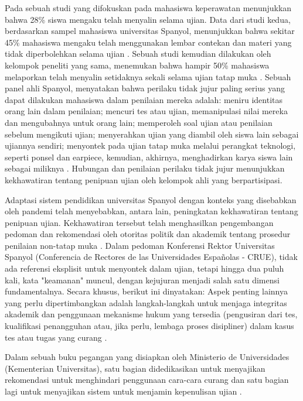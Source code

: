 Pada sebuah studi yang difokuskan pada mahasiswa keperawatan \citep{blanch2006nivel} menunjukkan bahwa 28\% siswa mengaku telah menyalin selama ujian. Data dari studi kedua, berdasarkan sampel mahasiswa universitas Spanyol, menunjukkan bahwa sekitar 45\% mahasiswa mengaku telah menggunakan lembar contekan dan materi yang tidak diperbolehkan selama ujian \citep{sureda2009practicas}. Sebuah studi kemudian dilakukan oleh kelompok peneliti yang sama, menemukan bahwa hampir 50\% mahasiswa melaporkan telah menyalin setidaknya sekali selama ujian tatap muka \citep{comas2011integridad}. Sebuah panel ahli Spanyol, menyatakan bahwa perilaku tidak jujur paling serius yang dapat dilakukan mahasiswa dalam penilaian mereka adalah: meniru identitas orang lain dalam penilaian; mencuri tes atau ujian, memanipulasi nilai mereka dan mengubahnya untuk orang lain; memperoleh soal ujian atau penilaian sebelum mengikuti ujian; menyerahkan ujian yang diambil oleh siswa lain sebagai ujiannya sendiri; menyontek pada ujian tatap muka melalui perangkat teknologi, seperti ponsel dan earpiece, kemudian, akhirnya, menghadirkan karya siswa lain sebagai miliknya \citep{sureda2020conductas}. Hubungan dan penilaian perilaku tidak jujur menunjukkan kekhawatiran tentang penipuan ujian oleh kelompok ahli yang berpartisipasi.

Adaptasi sistem pendidikan universitas Spanyol dengan konteks yang disebabkan oleh pandemi telah menyebabkan, antara lain, peningkatan kekhawatiran tentang penipuan ujian. Kekhawatiran tersebut telah menghasilkan pengembangan pedoman dan rekomendasi oleh otoritas politik dan akademik tentang prosedur penilaian non-tatap muka \citep{castells2020recomendaciones} \citep{cordon2020informe} \citep{gonzalez2020informe}. Dalam pedoman Konferensi Rektor Universitas Spanyol (Conferencia de Rectores de las Universidades Españolas - CRUE), tidak ada referensi eksplisit untuk menyontek dalam ujian, tetapi hingga dua puluh kali, kata "keamanan" muncul, dengan kejujuran menjadi salah satu dimensi fundamentalnya. Secara khusus, berikut ini dinyatakan:
Aspek penting lainnya yang perlu dipertimbangkan adalah langkah-langkah untuk menjaga integritas akademik dan penggunaan mekanisme hukum yang tersedia (pengusiran dari tes, kualifikasi penangguhan atau, jika perlu, lembaga proses disipliner) dalam kasus tes atau tugas yang curang \citep{cordon2020informe}.

Dalam sebuah buku pegangan yang disiapkan oleh Ministerio de Universidades (Kementerian Universitas), satu bagian didedikasikan untuk menyajikan rekomendasi untuk menghindari penggunaan cara-cara curang dan satu bagian lagi untuk menyajikan sistem untuk menjamin kepenulisan ujian \citet{gonzalez2020informe}.

